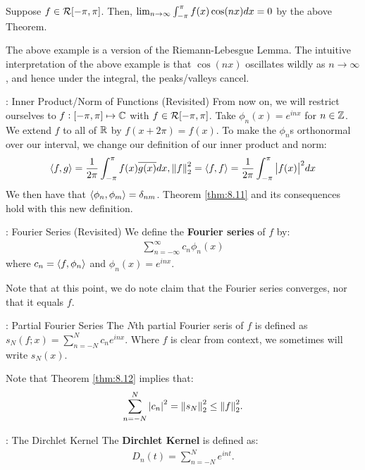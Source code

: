 \begin{nexample}{}{}
    Suppose $f \in \mathcal{R}[-\pi, \pi]$. Then, $\lim_{n \rightarrow \infty} \int_{-\pi}^{\pi} f(x)\cos(nx) dx = 0$ by the above Theorem. 
\end{nexample}
\noindent The above example is a version of the Riemann-Lebesgue Lemma. The intuitive interpretation of the above example is that $\cos(nx)$ oscillates wildly as $n \rightarrow \infty$, and hence under the integral, the peaks/valleys cancel.

\begin{ndef}{: Inner Product/Norm of Functions (Revisited)}{}
    From now on, we will restrict ourselves to $f: [-\pi, \pi] \mapsto \mathbb{C}$ with $f \in \mathcal{R}[-\pi, \pi]$. Take $\phi_n(x) = e^{inx}$ for $n \in \mathbb{Z}$. We extend $f$ to all of $\mathbb{R}$ by $f(x + 2\pi) = f(x)$. To make the $\phi_n$s orthonormal over our interval, we change our definition of our inner product and norm:
    \begin{align*}
        \left< f, g \right> = \frac{1}{2\pi}\int_{-\pi}^\pi f(x)\overline{g(x)}dx, \norm{f}_2^2 = \left< f, f \right> = \frac{1}{2\pi}\int_{-\pi}^\pi\abs{f(x)}^2 dx
    \end{align*}
    We then have that $\left< \phi_n, \phi_m \right> = \delta_{nm}$. Theorem \ref{thm:8.11} and its consequences hold with this new definition.
\end{ndef}

\begin{ndef}{: Fourier Series (Revisited)}{}
    We define the \textbf{Fourier series} of $f$ by:
    \begin{align*}
        \sum_{n=-\infty}^\infty c_n\phi_n(x)
    \end{align*}
    where $c_n = \left< f, \phi_n \right>$ and $\phi_n(x) = e^{inx}$.
\end{ndef}
\noindent Note that at this point, we do note claim that the Fourier series converges, nor that it equals $f$.

\begin{ndef}{: Partial Fourier Series}{}
    The $N$th partial Fourier seris of $f$ is defined as $s_N(f;x) = \sum_{n=-N}^N c_ne^{inx}$. Where $f$ is clear from context, we sometimes will write $s_N(x)$.
\end{ndef}
\noindent Note that Theorem \ref{thm:8.12} implies that:
\begin{align*}
    \sum_{n = -N}^{N} \abs{c_n}^2 = \norm{s_N}_2^2 \leq \norm{f}_2^2.
\end{align*}

\begin{ndef}{: The Dirchlet Kernel}{}
    The \textbf{Dirchlet Kernel} is defined as:
    \begin{align*}
        D_n(t) = \sum_{n=-N}^{N}e^{int}.
    \end{align*}
\end{ndef}

